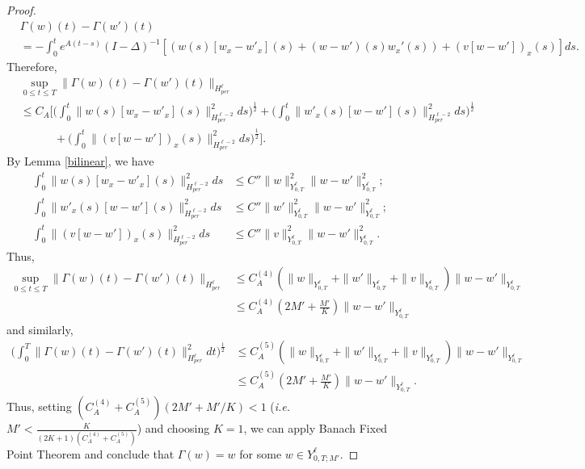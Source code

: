 \documentclass[10pt,a4paper]{amsart}
\newcommand{\GG}{\Gamma}
\begin{document}
\begin{proof}
\begin{align*}
    &\Gamma(w)(t)-\Gamma(w')(t)\\%
    &= -\int_0^t e^{A(t-s)}(I-\Delta)^{-1}[(w(s)[w_x-w'_x](s)+(w-w')(s)w_x'(s))+(v[w-w'])_x(s)]ds.
\end{align*}
Therefore, 
\begin{align*}
    &\sup_{0\leq t\leq T}\|\Gamma(w)(t)-\Gamma(w')(t)\|_{H^\ell_{per}}\\
    &\leq C_A\bigg[\bigg(\int_0^t\|w(s)[w_x-w'_x](s)\|^2_{H^{\ell-2}_{per}}ds\bigg)^{\frac12}+\bigg(\int_0^t\|w'_x(s)[w-w'](s)\|^2_{H^{\ell-2}_{per}}ds\bigg)^{\frac12}\\
    &\quad\quad\quad +\bigg(\int_0^t\|(v[w-w'])_x(s)\|^2_{H^{\ell-2}_{per}}ds\bigg)^{\frac12}\bigg].
\end{align*}
By Lemma \ref{bilinear}, we have 
\begin{align*}
    \int_0^t\|w(s)[w_x-w'_x](s)\|^2_{H^{\ell-2}_{per}}ds&\leq C'' \|w\|^2_{Y^{\ell}_{0,T}}\|w-w'\|^2_{Y^{\ell}_{0,T}};\\
    \int_0^t\|w'_x(s)[w-w'](s)\|^2_{H^{\ell-2}_{per}}ds&\leq C''\|w'\|^2_{Y^{\ell}_{0,T}}\|w-w'\|^2_{Y^{\ell}_{0,T}};\\
    \int_0^t\|(v[w-w'])_x(s)\|^2_{H^{\ell-2}_{per}}ds&\leq C''\|v\|_{Y^{\ell}_{0,T}}^2\|w-w'\|^2_{Y^{\ell}_{0,T}}.
\end{align*}
Thus, 
\begin{align*}
    \sup_{0\leq t\leq T}\|\Gamma(w)(t)-\Gamma(w')(t)\|_{H^{\ell}_{per}}&\leq C_A^{(4)}(\|w\|_{Y^{\ell}_{0,T}}+\|w'\|_{Y^{\ell}_{0,T}}+\|v\|_{Y^{\ell}_{0,T}})\|w-w'\|_{Y^{\ell}_{0,T}}\\
    &\leq C_A^{(4)}(2M'+\frac{M'}{K})\|w-w'\|_{Y^{\ell}_{0,T}}
\end{align*}
and similarly, 
\begin{align*}
    \bigg(\int_0^T\|\Gamma(w)(t)-\Gamma(w')(t)\|_{H^\ell_{per}}^2dt\bigg)^\frac{1}{2}&\leq C_A^{(5)}(\|w\|_{Y^{\ell}_{0,T}}+\|w'\|_{Y^{\ell}_{0,T}}+\|v\|_{Y^{\ell}_{0,T}})\|w-w'\|_{Y^{\ell}_{0,T}}\\
    &\leq C_A^{(5)} (2M'+\frac{M'}{K})\|w-w'\|_{Y^{\ell}_{0,T}}.
\end{align*}
Thus, setting $(C^{(4)}_A+C^{(5)}_A)(2M'+M'/K)<1$ (\textit{i.e.} $M'<\frac{K}{(2K+1)(C^{(4)}_A+C^{(5)}_A)}$) and choosing $K=1$, we can apply Banach Fixed Point Theorem and conclude that $\GG(w)=w$ for some $w\in Y^{\ell}_{0,T;M'}$.  
\end{proof}
\end{document}
